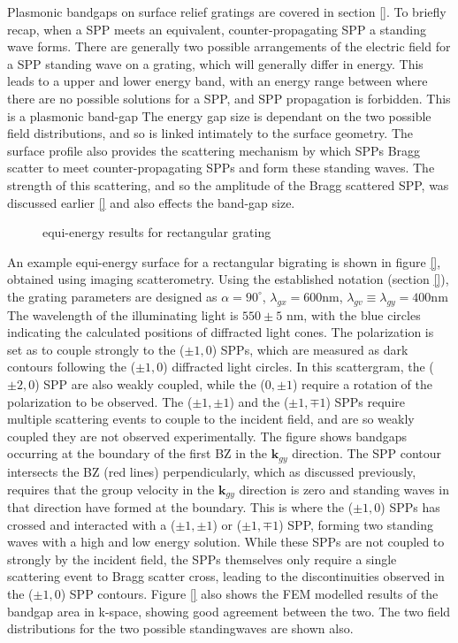 \documentclass[oneside,11pt,book]{book}
\begin{document}
Plasmonic bandgaps on surface relief gratings are covered in section \ref{}. To briefly recap, when a SPP meets an equivalent, counter-propagating SPP a standing wave forms. There are generally two possible arrangements of the electric field  for a SPP standing wave on a grating, which will generally differ in energy. This leads to a upper and lower energy band, with an energy range between where there are no possible solutions for a SPP, and SPP propagation is forbidden. This is a plasmonic band-gap
The energy gap size is dependant on the two possible field distributions, and so is linked intimately to the surface geometry. The surface profile also provides the scattering mechanism by which SPPs Bragg scatter to meet counter-propagating SPPs and form these standing waves. The strength of this scattering, and so the amplitude of the Bragg scattered SPP, was discussed earlier \ref{} and also effects the band-gap size.
\begin{figure}
\caption{equi-energy results for rectangular grating}
\end{figure}
An example equi-energy surface for a rectangular bigrating is shown in figure \ref{}, obtained using imaging scatterometry. Using the established notation (section \ref{}), the grating parameters are designed as $\alpha=90^\circ$, $\lambda_{gx}=600 $nm, $\lambda_{gv}\equiv\lambda_{gy}=400 $nm  The wavelength of the illuminating light is $550 \pm 5$ nm, with the blue circles indicating the calculated positions of diffracted light cones. The polarization is set as to couple strongly to the ($\pm 1,0$) SPPs, which are measured as dark contours following the ($\pm 1,0$) diffracted light circles. In this scattergram, the ($\pm 2,0$) SPP are also weakly coupled, while the ($0,\pm 1$) require a rotation of the polarization to be observed. The ($\pm 1, \pm 1$) and the ($\pm 1, \mp 1$) SPPs require multiple scattering events to couple to the incident field, and are so weakly coupled they are not observed experimentally.
The figure shows bandgaps occurring at the boundary of the first BZ in the $\mathbf{k}_{gy}$ direction. The SPP contour intersects the BZ (red lines) perpendicularly, which as discussed previously, requires that the group velocity in the $\mathbf{k}_{gy}$ direction is zero and standing waves in that direction have formed at the boundary.  This is where the ($\pm 1, 0$) SPPs has crossed and interacted with a ($\pm 1, \pm 1$) or ($\pm 1, \mp 1$) SPP, forming two standing waves with a high and low energy solution. While these SPPs are not coupled to strongly by the incident field, the SPPs themselves only require a single scattering event to Bragg scatter cross, leading to the discontinuities observed in the ($\pm 1,0$) SPP contours. 
Figure \ref{} also shows the FEM modelled results of the bandgap area in k-space, showing good agreement between the two. The two field distributions for the two possible standingwaves are shown also. 
 
\end{document}

